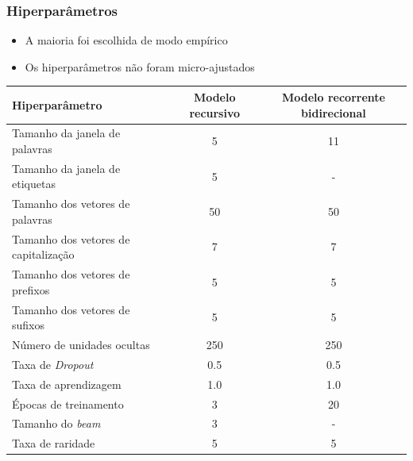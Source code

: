 \documentclass[10pt]{beamer}
\begin{document}
\begin{frame}[fragile]
  \frametitle{Hiperparâmetros}

  \begin{itemize}

    \item A maioria foi escolhida de modo empírico

    \item Os hiperparâmetros não foram micro-ajustados

  \end{itemize}

  \begin{table}[!htb]
  \scriptsize
  \centering
  \begin{tabular}{lcc}
    \toprule
    \textbf{Hiperparâmetro} & \textbf{Modelo recursivo} & \textbf{Modelo recorrente bidirecional}  \\
    \midrule
    Tamanho da janela de palavras     & 5 & 11 \\
    Tamanho da janela de etiquetas      & 5 & - \\
    Tamanho dos vetores de palavras     & 50 & 50\\
    Tamanho dos vetores de capitalização  & 7 & 7 \\
    Tamanho dos vetores de prefixos     & 5 & 5 \\
    Tamanho dos vetores de sufixos    & 5 & 5 \\
    Número de unidades ocultas      & 250 & 250 \\
    Taxa de \textit{Dropout}      & 0.5 & 0.5 \\
    Taxa de aprendizagem          & 1.0 & 1.0 \\
    Épocas de treinamento         & 3 & 20 \\
    Tamanho do \textit{beam}        & 3 & - \\
    Taxa de raridade            & 5 & 5 \\
    \bottomrule
  \end{tabular}
  \end{table}

\end{frame}
\end{document}
